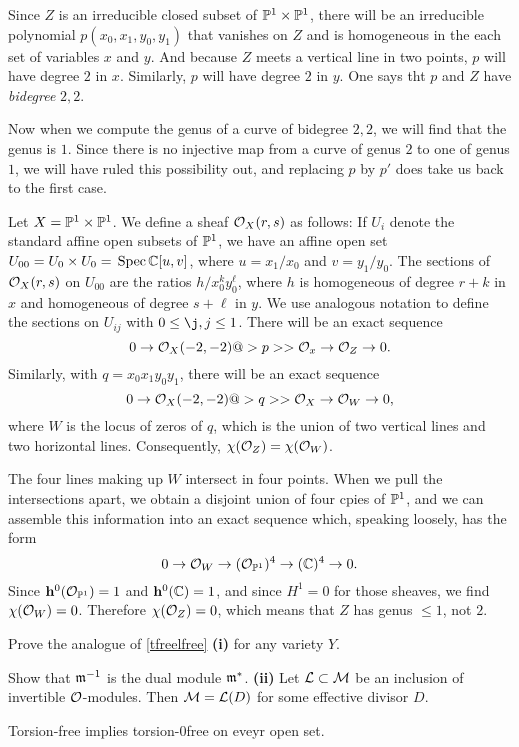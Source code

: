 \documentclass[leqno]{book}
\theoremstyle{definition}%
\numberwithin{equation}{section}
\theoremstyle{theorem} %
\begin{document}
Since $Z$ is an irreducible closed subset of $\mathbb{P}^1\times\mathbb{P}^1$, there
will be an irreducible polynomial $p(x_0,x_1,y_0,y_1)$ that vanishes
on $Z$ and is homogeneous in the each set of variables $x$ and
$y$.  And because $Z$ meets a vertical line in two points, $p$ will
have degree $2$ in $x$.  Similarly, $p$ will have degree $2$ in $y$.
One says tht $p$ and $Z$ have {\it bidegree} $2,2$.

Now when we compute the genus of a curve of bidegree $2,2$, we will
find that the genus is $1$.  Since there is no injective map from a
curve of genus $2$ to one of genus $1$, we will have ruled this
possibility out, and replacing $p$ by $p'$ does take us back to the
first case.

Let $X = \mathbb{P}^1\times \mathbb{P}^1$.  We define a sheaf $\co_X(r,s)$ as follows:
If $U_i$ denote the standard affine open subsets of $\mathbb{P}^1$, we have
an affine open set $U_{00}= U_0\times U_0 = \,\operatorname{Spec} \mathbb{C}[u,v]$, where $u
= x_1/x_0$ and $v=y_1/y_0$.  The sections of $\co_X(r,s)$ on $U_{00}$
are the ratios $h/x_0^ky_0^\ell$, where $h$ is homogeneous of degree
$r+k$ in $x$ and homogeneous of degree $s+\ell$ in $y$.  We use
analogous notation to define the sections on $U_{ij}$ with $0 \leq
\j,j\leq 1$.  There will be an exact sequence
$$0 \ar \co_X(-2,-2) @> p>> \co_x \ar \co_Z \ar 0.$$
Similarly, with $q = x_0x_1y_0y_1$, there will be an exact sequence
$$0 \ar \co_X(-2,-2)@> q>> \co_X \ar \co_W\ar 0,$$
where $W$ is the locus of zeros of $q$, which is the union of two
vertical lines and two horizontal lines.  Consequently, $\chi(\co_Z) =
\chi(\co_W)$.

The four lines making up $W$ intersect in four points.  When we pull
the intersections apart, we obtain a disjoint union of four cpies of
$\mathbb{P}^1$, and we can assemble this information into an exact sequence
which, speaking loosely, has the form
$$0 \ar \co_W \ar (\co_{\bbp^1})^4 \ar (\bbc)^4 \ar 0.$$
Since $\hh^0(\co_{\bbp^1}) = 1$ and ${\mathbf{h}}^0(\mathbb{C}) =1$, and since
$H^1 =0$ for those sheaves, we find $\chi(\co_W) =0$.  Therefore
$\chi(\co_Z)=0$, which means that $Z$ has genus $\leq 1$, not $2$.  


\bs
Prove the analogue of \ref{tfreelfree} {\bf (i)} for any variety $Y$.


\bs Show that  $\mathfrak m^{-1}$ is the dual module $\mathfrak m^*$.
\bs
\no
{\bf (ii)} Let $\CL \subset \cm$ be an
inclusion of invertible $\co$-modules.  Then $\cm = \CL(D)$ for some
effective divisor $D$.

\bs


Torsion-free implies torsion-0free on eveyr open set.
\end{document}
